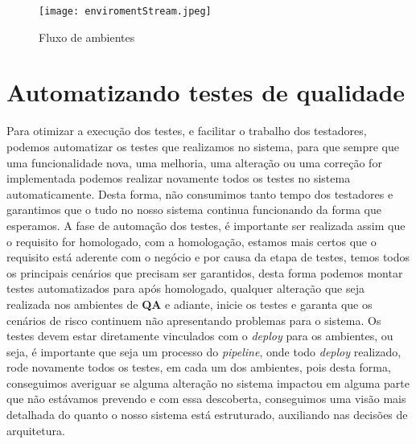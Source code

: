       \begin{figure}[!h]
        \centering
        \texttt{[image: enviromentStream.jpeg]}
        \caption{Fluxo de ambientes}
        \label{Imagem:2}
      \end{figure}

    \section{Automatizando testes de qualidade}
      Para otimizar a execução dos testes, e facilitar o trabalho dos testadores,
      podemos automatizar os testes que realizamos no sistema, para que sempre que
      uma funcionalidade nova, uma melhoria, uma alteração ou uma correção for
      implementada podemos realizar novamente todos os testes no sistema
      automaticamente. Desta forma, não consumimos tanto tempo dos testadores e
      garantimos que o tudo no nosso sistema continua funcionando da forma que
      esperamos. A fase de automação dos testes, é importante ser realizada assim
      que o requisito for homologado, com a homologação, estamos mais certos que o
      requisito está aderente com o negócio e por causa da etapa de testes, temos
      todos os principais cenários que precisam ser garantidos, desta forma podemos
      montar testes automatizados para após homologado, qualquer alteração que seja
      realizada nos ambientes de \textbf{QA} e adiante, inicie os testes e garanta
      que os cenários de risco continuem não apresentando problemas para o sistema. \newline
      Os testes devem estar diretamente vinculados com o \textit{deploy} para os
      ambientes, ou seja, é importante que seja um processo do \textit{pipeline},
      onde todo \textit{deploy} realizado, rode novamente todos os testes, em cada
      um dos ambientes, pois desta forma, conseguimos averiguar se alguma alteração
      no sistema impactou em alguma parte que não estávamos prevendo e com essa
      descoberta, conseguimos uma visão mais detalhada do quanto o nosso sistema
      está estruturado, auxiliando nas decisões de arquitetura.

